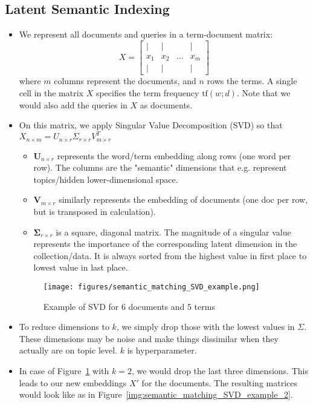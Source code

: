 \subsection{Latent Semantic Indexing}
\begin{itemize}
	\item We represent all documents and queries in a term-document matrix:
	$$X = \left[\begin{array}{cccc}
	| & | &  & | \\
	x_1 & x_2 & \dots & x_m \\
	| & | &  & | 
	\end{array}\right]$$
	where $m$ columns represent the documents, and $n$ rows the terms. A single cell in the matrix $X$ specifies the term frequency $\text{tf}(w;d)$. Note that we would also add the queries in $X$ as documents.
	\item On this matrix, we apply Singular Value Decomposition (SVD) so that $X_{n\times m} = U_{n \times r} \Sigma_{r\times r} V_{m\times r}^T$
	\begin{itemize}
		\item $\bm{U}_{n \times r}$ represents the word/term embedding along rows (one word per row). The columns are the "semantic" dimensions that e.g. represent topics/hidden lower-dimensional space. 
		\item $\bm{V}_{m \times r}$ similarly represents the embedding of documents (one doc per row, but is transposed in calculation). 
		\item $\bm{\Sigma}_{r \times r}$ is a square, diagonal matrix. The magnitude of a singular value represents the importance of the corresponding latent dimension in the collection/data. It is always sorted from the highest value in first place to lowest value in last place.
	\end{itemize}
	\begin{figure}[ht]
		\centering
		\texttt{[image: figures/semantic\_matching\_SVD\_example.png]}
		\caption{Example of SVD for 6 documents and 5 terms}
		\label{img:semantic_matching_SVD_example}
	\end{figure}
	\item To reduce dimensions to $k$, we simply drop those with the lowest values in $\Sigma$. These dimensions may be noise and make things dissimilar when they actually are on topic level. $k$ is hyperparameter.
	\item In case of Figure~\ref{img:semantic_matching_SVD_example} with $k=2$, we would drop the last three dimensions. This leads to our new embeddings $X'$ for the documents. The resulting matrices would look like as in Figure~\ref{img:semantic_matching_SVD_example_2}.

\end{itemize}
